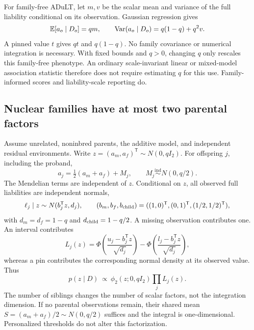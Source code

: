 For family-free ADuLT, let $m,v$ be the scalar mean and variance of the full
liability conditional on its observation. Gaussian regression gives
\begin{equation}
 \mathbb{E}[a_o\mid D_o]=qm,\qquad
 \mathrm{Var}(a_o\mid D_o)=q(1-q)+q^2v.
 \label{eq:adult-exact}
\end{equation}
A pinned value $t$ gives $qt$ and $q(1-q)$. No family covariance or numerical
integration is necessary. With fixed bounds and $q>0$, changing $q$ only
rescales this family-free phenotype. An ordinary scale-invariant linear or
mixed-model association statistic therefore does not require estimating $q$
for this use. Family-informed scores and liability-scale reporting do.

\subsection{Nuclear families have at most two parental factors}
\label{sec:parent-factors}

Assume unrelated, noninbred parents, the additive model, and independent
residual environments. Write $z=(a_m,a_f)^\mathsf{T}\sim N(0,qI_2)$.
For offspring $j$, including the proband,
\begin{equation}
 a_j=\tfrac12(a_m+a_f)+M_j,\qquad
 M_j\overset{\mathrm{ind}}\sim N(0,q/2).
 \label{eq:offspring-factor}
\end{equation}
The Mendelian terms are independent of $z$. Conditional on $z$, all observed
full liabilities are independent normals,
\begin{equation}
 \ell_j\mid z\sim N(b_j^\mathsf{T}z,d_j),\qquad
 (b_m,b_f,b_{\rm child})=((1,0)^\mathsf{T},(0,1)^\mathsf{T},
                          (1/2,1/2)^\mathsf{T}),
 \label{eq:factor-liability}
\end{equation}
with $d_m=d_f=1-q$ and $d_{\rm child}=1-q/2$.
A missing observation contributes one. An interval contributes
\begin{equation}
 L_j(z)=\Phi\!\left(\frac{u_j-b_j^\mathsf{T}z}{\sqrt{d_j}}\right)
       -\Phi\!\left(\frac{l_j-b_j^\mathsf{T}z}{\sqrt{d_j}}\right),
 \label{eq:factor-likelihood}
\end{equation}
whereas a pin contributes the corresponding normal density at its observed
value. Thus
\begin{equation}
 p(z\mid D)\ \propto\ \phi_2(z;0,qI_2)\prod_j L_j(z).
 \label{eq:factor-posterior}
\end{equation}
The number of siblings changes the number of scalar factors, not the
integration dimension. If no parental observations remain, their shared mean
$S=(a_m+a_f)/2\sim N(0,q/2)$ suffices and the integral is one-dimensional.
Personalized thresholds do not alter this factorization.

